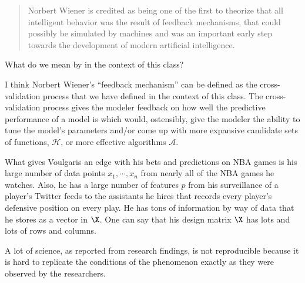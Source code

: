 \documentclass[12pt]{article}
\begin{document}
\begin{enumerate}
{\begin{quote}
Norbert Wiener is credited as being one of the first to theorize that all intelligent behavior was the result of feedback mechanisms, that could possibly be simulated by machines and was an important early step towards the development of modern artificial intelligence.
\end{quote}

What do we mean by  in the context of this class?}

\begin{tcolorbox}[colback=white, sharp corners]
I think Norbert Wiener's ``feedback mechanism'' can be defined as the cross-validation process that we have defined in the context of this class. The cross-validation process gives the modeler feedback on how well the predictive performance of a model is which would, ostensibly, give the modeler the ability to tune the model's parameters and/or come up with more expansive candidate sets of functions, $\mathcal{H}$, or more effective algorithms $\mathcal{A}$. 
\end{tcolorbox}



\begin{tcolorbox}[colback=white, sharp corners]
What gives Voulgaris an edge with his bets and predictions on NBA games is his large number of data points $x_1, \cdots, x_n$ from nearly all of the NBA games he watches. Also, he has a large number of features $p$ from his surveillance of a player's Twitter feeds to the assistants he hires that records every player's defensive position on every play. He has tons of information by way of data that he stores as a vector in $\X$. One can say that his design matrix $\X$ has lots and lots of rows and columns. 
\end{tcolorbox}



\begin{tcolorbox}[colback=white, sharp corners]
A lot of science, as reported from research findings, is not reproducible because it is hard to replicate the conditions of the phenomenon exactly as they were observed by the researchers. 
\end{tcolorbox}



\end{enumerate}
\end{document}

